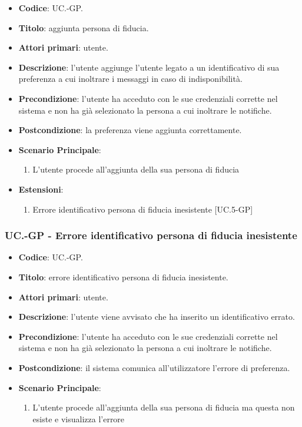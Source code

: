 		\begin{itemize}
			\item \textbf{Codice}: UC\theuccount.\thesubuccount-GP.
			\item \textbf{Titolo}: aggiunta persona di fiducia.
			\item \textbf{Attori primari}: utente.
			\item \textbf{Descrizione}: l’utente aggiunge l'utente legato a un identificativo di sua preferenza a cui inoltrare i messaggi in caso di indisponibilità.
			\item \textbf{Precondizione}: l’utente ha acceduto con le sue credenziali corrette nel sistema e non ha già selezionato la persona a cui inoltrare le notifiche.
			\item \textbf{Postcondizione}: la preferenza viene aggiunta correttamente.
			\item \textbf{Scenario Principale}:
			\begin{enumerate}
				\item L'utente procede all'aggiunta della sua persona di fiducia
			\end{enumerate}
			\item \textbf{Estensioni}:
			\begin{enumerate}
				\item Errore identificativo persona di fiducia inesistente [UC\theuccount.5-GP]
			\end{enumerate}
		\end{itemize}
	
	\subsubsection{UC\theuccount.\thesubuccount-GP - Errore identificativo persona di fiducia inesistente}
		
		\begin{itemize}
			\item \textbf{Codice}: UC\theuccount.\thesubuccount-GP.
			\item \textbf{Titolo}: errore identificativo persona di fiducia inesistente.
			\item \textbf{Attori primari}: utente.
			\item \textbf{Descrizione}: l’utente viene avvisato che ha inserito un identificativo errato.
			\item \textbf{Precondizione}: l’utente ha acceduto con le sue credenziali corrette nel sistema e non ha già selezionato la persona a cui inoltrare le notifiche.
			\item \textbf{Postcondizione}: il sistema comunica all’utilizzatore l’errore di preferenza.
			\item \textbf{Scenario Principale}:
			\begin{enumerate}
				\item L'utente procede all'aggiunta della sua persona di fiducia ma questa non esiste e visualizza l'errore
			\end{enumerate}
		\end{itemize}
	
